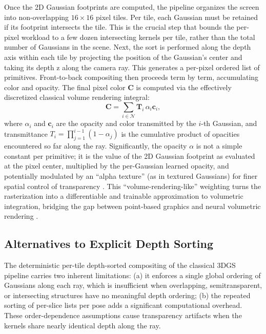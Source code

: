\documentclass[11pt,a4paper]{article}
\begin{document}
Once the 2D Gaussian footprints are computed, the pipeline organizes the screen into non-overlapping \(16 \times 16\) pixel tiles. Per tile, each Gaussian must be retained if its footprint intersects the tile. This is the crucial step that bounds the per-pixel workload to a few dozen intersecting kernels per tile, rather than the total number of Gaussians in the scene. Next, the sort is performed along the depth axis within each tile by projecting the position of the Gaussian's center and taking its depth z along the camera ray. This generates a per-pixel ordered list of primitives. Front-to-back compositing then proceeds term by term, accumulating color and opacity. The final pixel color \(\mathbf{C}\) is computed via the effectively discretized classical volume rendering integral:
\[
\mathbf{C} = \sum_{i \in \mathcal{N}} \mathbf{T}_{i}\, \alpha_{i} \mathbf{c}_{i},
\]
where \(\alpha_{i}\) and \(\mathbf{c}_{i}\) are the opacity and color transmitted by the \(i\)-th Gaussian, and transmittance \(T_{i} = \prod_{j=1}^{i-1} (1-\alpha_{j})\) is the cumulative product of opacities encountered so far along the ray. Significantly, the opacity \(\alpha\) is not a simple constant per primitive; it is the value of the 2D Gaussian footprint as evaluated at the pixel center, multiplied by the per-Gaussian learned opacity, and potentially modulated by an ``alpha texture'' (as in textured Gaussians) for finer spatial control of transparency \cite{arxiv:2411.18625v2,arxiv:2407.09733v2,arxiv:2507.20200v1}. This ``volume-rendering-like'' weighting turns the rasterization into a differentiable and trainable approximation to volumetric integration, bridging the gap between point-based graphics and neural volumetric rendering \cite{arxiv:2601.17835v2,arxiv:2409.12954v1}.


\subsection{Alternatives to Explicit Depth Sorting}


The deterministic per-tile depth-sorted compositing of the classical 3DGS pipeline carries two inherent limitations: (a) it enforces a single global ordering of Gaussians along each ray, which is insufficient when overlapping, semitransparent, or intersecting structures have no meaningful depth ordering; (b) the repeated sorting of per-slice lists per pose adds a significant computational overhead. These order-dependence assumptions cause transparency artifacts when the kernels share nearly identical depth along the ray.
\end{document}
